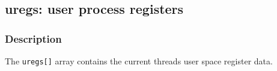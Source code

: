 \clearpage
{}
{}
\label{vars:uregs}
\subsection*{uregs: user process registers}

\subsubsection*{Description}

The \verb|uregs[]| array contains the current threads user space
register data.

